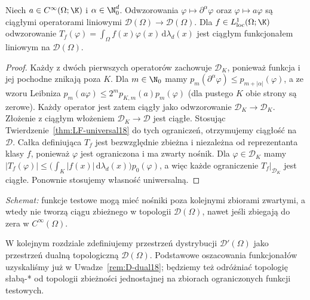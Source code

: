 \begin{stwierdzenie}
\label{prop:D-operators18}
Niech $a\in C^\infty(\Omega;\K)$ i
$\alpha\in\N_0^d$. Odwzorowania
$\varphi\mapsto\partial^\alpha\varphi$ oraz
$\varphi\mapsto a\varphi$ są ciągłymi operatorami
liniowymi $\mathcal D(\Omega)\to\mathcal D(\Omega)$.
Dla $f\in L^1_{\mathrm{loc}}(\Omega;\K)$ odwzorowanie
$T_f(\varphi)=\int_\Omega f(x)\varphi(x)\,\mathrm d\lambda_d(x)$
jest ciągłym funkcjonałem liniowym na $\mathcal D(\Omega)$.
\end{stwierdzenie}
\begin{proof}
Każdy z dwóch pierwszych operatorów zachowuje
$\mathcal D_K$, ponieważ funkcja i jej pochodne znikają
poza $K$. Dla $m\in\N_0$ mamy
$p_m(\partial^\alpha\varphi)\le p_{m+|\alpha|}(\varphi)$,
a ze wzoru Leibniza
$p_m(a\varphi)\le 2^m p_{K,m}(a)p_m(\varphi)$
(dla pustego $K$ obie strony są zerowe).
Każdy operator jest zatem ciągły jako odwzorowanie
$\mathcal D_K\to\mathcal D_K$. Złożenie z ciągłym
włożeniem $\mathcal D_K\to\mathcal D$ jest ciągłe.
Stosując Twierdzenie~\ref{thm:LF-universal18} do tych
ograniczeń, otrzymujemy ciągłość na $\mathcal D$.
Całka definiująca $T_f$ jest bezwzględnie zbieżna
i niezależna od reprezentanta klasy $f$, ponieważ
$\varphi$ jest ograniczona i ma zwarty nośnik.
Dla $\varphi\in\mathcal D_K$ mamy
$|T_f(\varphi)|\le
\bigl(\int_K|f(x)|\,\mathrm d\lambda_d(x)\bigr)p_0(\varphi)$,
a więc każde ograniczenie $T_f|_{\mathcal D_K}$
jest ciągłe. Ponownie stosujemy własność uniwersalną.
\end{proof}

\begin{center}

\small\emph{Schemat:} funkcje testowe mogą mieć nośniki poza
kolejnymi zbiorami zwartymi, a wtedy nie tworzą ciągu zbieżnego
w topologii $\mathcal D(\Omega)$, nawet jeśli zbiegają do zera
w $C^\infty(\Omega)$.
\end{center}

\begin{uwaga}
\label{rem:D-distributions-next18}
W kolejnym rozdziale zdefiniujemy przestrzeń dystrybucji
$\mathcal D'(\Omega)$ jako przestrzeń dualną topologiczną
$\mathcal D(\Omega)$. Podstawowe oszacowania funkcjonałów
uzyskaliśmy już w Uwadze~\ref{rem:D-dual18}; będziemy też
odróżniać topologię słabą-* od topologii zbieżności
jednostajnej na zbiorach ograniczonych funkcji testowych.
\end{uwaga}
